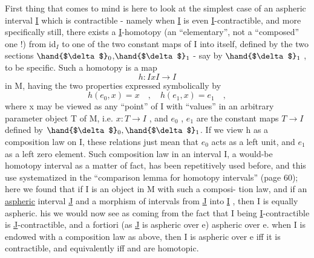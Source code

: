 First thing that comes to mind is here to look at the simplest case
of an aspheric interval  \uline{I} which is contractible  -  namely when
\uline{I} is even \uline{I}-contractible,  and more specifically still,   there exists
a \uline{I}-homotopy (an ``elementary'',  not a ``composed'' one !) 
from id$_I$ to one of the two constant maps of I into itself,  defined by the
two sections $\hand{$\delta$}_0$,$\hand{$\delta$}_1$  - say by $\hand{$\delta$}_1$ , to be specific.  Such a homotopy is a
map
\[ h\colon IxI \to I \]
in M,  having the two properties expressed symbolically by
\[ h(e_0,x) = x \quad , \quad h(e_1,x) = e_1 \quad , \]
where x may be viewed as any ``point'' of I with ``values'' in an arbitrary
parameter object T of M,  i.e.  $x : T \to I$ ,  and $e_0$ , $e_1$ are the constant
maps $T \to I$ defined by $\hand{$\delta$}_0,\hand{$\delta$}_1$.  If we view h as a composition law on I,
these relations just mean that $e_0$ acts as a left unit,  and $e_1$ as a left
zero element.  Such composition law in an interval I,  a would-be homotopy
interval as a matter of fact,  has been repetitively used before,  and
this use systematized in the ``comparison lemma for homotopy intervals''
(page 60);  here we found that if I is an object in M with such a composi-%
tion law,  and if   an \uline{aspheric} interval \uline{J} and a morphism of intervals
from \uline{J} into \uline{I} ,  then I is equally aspheric. his we would now see as
coming from the fact that I being \uline{I}-contractible is  \uline{J}-contractible, and
a fortiori (as \uline{J} is aspheric over e) aspheric over e. 
 when I is endowed with a composition law as above, then
I is aspheric over e iff it is contractible,  and equivalently iff  and
 are homotopic. 
